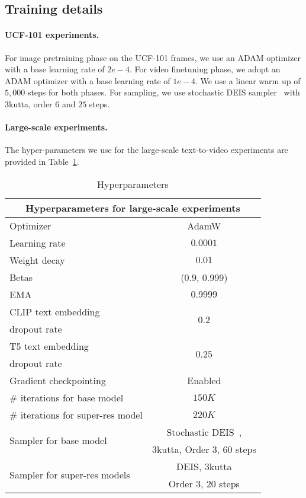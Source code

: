 \documentclass[10pt,twocolumn,letterpaper]{article}
\begin{document}
\subsection{Training details}
\label{sec:training_details}
\paragraph{UCF-101 experiments.} For image pretraining phase on the UCF-101 frames, we use an ADAM optimizer with a base learning rate of $2e-4$. For video finetuning phase, we adopt an ADAM optimizer with a base learning rate of $1e-4$. We use a linear warm up of $5,000$ steps for both phases. For sampling, we use stochastic DEIS sampler~\cite{zhang2023fast, karras2022elucidating} with 3kutta, order $6$ and $25$ steps.

\paragraph{Large-scale experiments.} The hyper-parameters we use for the large-scale text-to-video experiments are provided in Table~\ref{tab:hyperparams}.




\begin{table}[ht!]
    \centering
    \caption{Hyperparameters}
    \vspace{-1mm}
    \label{tab:hyperparams}
\begin{tabular}{l c}
        \toprule
        \multicolumn{2}{c}{Hyperparameters for large-scale experiments}\\
        \midrule
        Optimizer & AdamW \\
        Learning rate & $0.0001$ \\
        Weight decay & $0.01$ \\
        Betas & (0.9, 0.999) \\
        EMA & $0.9999$ \\
        CLIP text embedding & \multirow{2}{*}{$0.2$} \\
        dropout rate & \\
        T5 text embedding  & \multirow{2}{*}{$0.25$} \\
        dropout rate & \\
        Gradient checkpointing & Enabled \\
        \# iterations for base model & $150K$ \\
        \# iterations for super-res model & $220K$ \\
        \multirow{2}{*}{Sampler for base model} & Stochastic DEIS~\cite{zhang2023fast, karras2022elucidating},  \\
        & 3kutta, Order 3, 60 steps \\
        \multirow{2}{*}{Sampler for super-res models} & DEIS, 3kutta \\
        & Order 3, 20 steps \\
        \bottomrule
    \end{tabular}
\end{table} 
\end{document}
